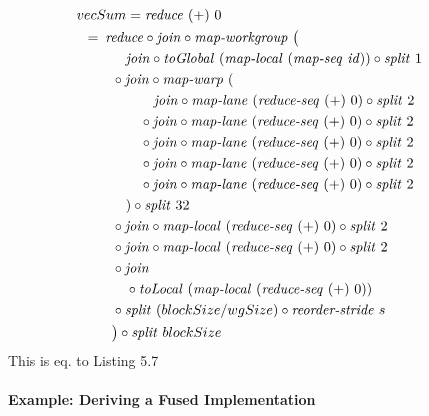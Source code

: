 \begin{align}
  &\hspace{-1.5em}vecSum = \reduce\ (+)\ 0\nonumber\\
  &\hspace{-2em}\quad\begin{aligned}
    &=\hspace{.2em}
      \reduce \circ \join \circ \mapWorkgroup\ \big(\\
      &\qquad\ \ \ \join \circ \toGlobal\ (\mapLocal\ (\mapSeq\ \id)) \circ \splitN\ 1\\
      &\qquad \circ \join \circ \mapWarp\ (\\
      &\qquad\qquad\ \ \ \join \circ \mapLane\ (\reduceSeq\ (+)\ 0) \circ \splitN\ 2\\
      &\qquad\qquad \circ \join \circ \mapLane\ (\reduceSeq\ (+)\ 0) \circ \splitN\ 2\\
      &\qquad\qquad \circ \join \circ \mapLane\ (\reduceSeq\ (+)\ 0) \circ \splitN\ 2\\
      &\qquad\qquad \circ \join \circ \mapLane\ (\reduceSeq\ (+)\ 0) \circ \splitN\ 2\\
      &\qquad\qquad \circ \join \circ \mapLane\ (\reduceSeq\ (+)\ 0) \circ \splitN\ 2\\
      &\qquad\quad) \circ \splitN\ 32\\
      &\qquad \circ \join \circ \mapLocal\ (\reduceSeq\ (+)\ 0) \circ \splitN\ 2\\
      &\qquad \circ \join \circ \mapLocal\ (\reduceSeq\ (+)\ 0) \circ \splitN\ 2\\
      &\qquad \circ \join\\
      &\qquad\quad \circ\toLocal\ (\mapLocal\ (\reduceSeq\ (+)\ 0))\\
      &\qquad \circ \splitN\ (blockSize/wgSize) \circ \reorderStride\ s\\
      &\qquad\big) \circ \splitN\ blockSize
  \end{aligned}
\end{align}
This is eq. to Listing 5.7

\paragraph{Example: Deriving a Fused Implementation}

